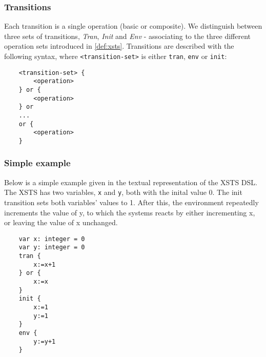 \subsubsection{Transitions}

Each transition is a single operation (basic or composite). We distinguish between three sets of transitions, \emph{Tran}, \emph{Init} and \emph{Env} - associating to the three different operation sets introduced in \autoref{def:xsts}. Transitions are described with the following syntax, where \verb|<transition-set>| is either \verb|tran|, \verb|env| or \verb|init|:

\begin{Verbatim}
	<transition-set> {
		<operation>
	} or {
		<operation>
	} or
	...
	or {
		<operation>
	}

\end{Verbatim}

\subsubsection{Simple example}

Below is a simple example given in the textual representation of the XSTS DSL. The XSTS has two variables, \verb|x| and \verb|y|, both with the inital value 0. The init transition sets both variables’ values to 1. After this, the environment repeatedly increments the value of y, to which the systems reacts by either incrementing x, or leaving the value of x unchanged.

\begin{Verbatim}
	var x: integer = 0
	var y: integer = 0
	tran {
		x:=x+1
	} or {
		x:=x
	}
	init {
		x:=1
		y:=1
	}
	env {
		y:=y+1
	}
\end{Verbatim}

